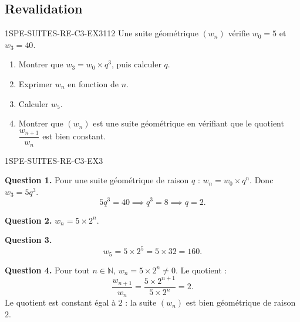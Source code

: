 \subsection*{Revalidation}


\begin{exercice}{1SPE-SUITES-RE-C3-EX3}{1}{12}
Une suite géométrique $(w_n)$ vérifie $w_0 = 5$ et $w_3 = 40$.
\begin{enumerate}
  \item Montrer que $w_3 = w_0 \times q^3$, puis calculer $q$.
  \item Exprimer $w_n$ en fonction de $n$.
  \item Calculer $w_5$.
  \item Montrer que $(w_n)$ est une suite géométrique en vérifiant que le quotient $\dfrac{w_{n+1}}{w_n}$ est bien constant.
\end{enumerate}
\end{exercice}


\begin{corrige}{1SPE-SUITES-RE-C3-EX3}


\textbf{Question 1.} Pour une suite géométrique de raison $q$ : $w_n = w_0 \times q^n$. Donc $w_3 = 5q^3$.
\[
5q^3 = 40 \implies q^3 = 8 \implies q = 2.
\]

\textbf{Question 2.} $w_n = 5 \times 2^n$.

\textbf{Question 3.}
\[
w_5 = 5 \times 2^5 = 5 \times 32 = 160.
\]

\textbf{Question 4.} Pour tout $n \in \mathbb{N}$, $w_n = 5 \times 2^n
\neq 0$. Le quotient :
\[
\frac{w_{n+1}}{w_n} = \frac{5 \times 2^{n+1}}{5 \times 2^n} = 2.
\]
Le quotient est constant égal à $2$ : la suite $(w_n)$ est bien géométrique de raison $2$.

\end{corrige}
